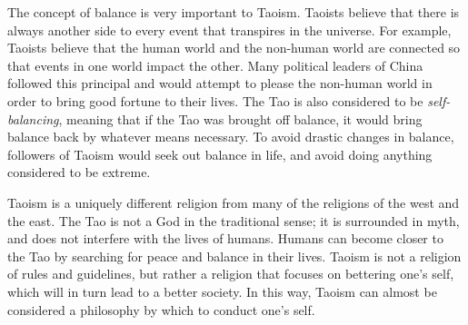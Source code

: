\documentclass[12pt]{article}
\begin{document}
The concept of balance is very important to Taoism. Taoists believe that there is always another side to every event that transpires in the universe. For example, Taoists believe that the human world and the non-human world are connected so that events in one world impact the other. Many political leaders of China followed this principal and would attempt to please the non-human world in order to bring good fortune to their lives. The Tao is also considered to be \textit{self-balancing}, meaning that if the Tao was brought off balance, it would bring balance back by whatever means necessary. To avoid drastic changes in balance, followers of Taoism would seek out balance in life, and avoid doing anything considered to be extreme.

Taoism is a uniquely different religion from many of the religions of the west and the east. The Tao is not a God in the traditional sense; it is surrounded in myth, and does not interfere with the lives of humans. Humans can become closer to the Tao by searching for peace and balance in their lives. Taoism is not a religion of rules and guidelines, but rather a religion that focuses on bettering one's self, which will in turn lead to a better society. In this way, Taoism can almost be considered a philosophy by which to conduct one's self.

\newpage

\nocite{*}
\printbibliography
\end{document}

